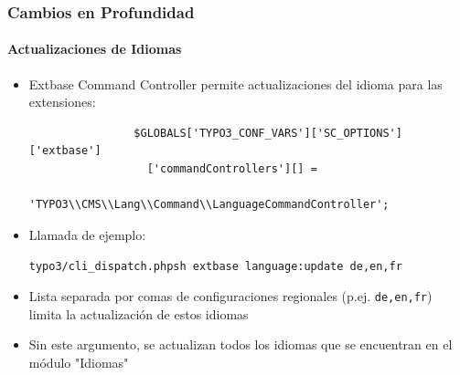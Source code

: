 
\begin{frame}[fragile]
	\frametitle{Cambios en Profundidad}
	\framesubtitle{Actualizaciones de Idiomas}

	\begin{itemize}
		\item Extbase Command Controller permite actualizaciones del idioma para las extensiones:

			\begin{lstlisting}
				$GLOBALS['TYPO3_CONF_VARS']['SC_OPTIONS']['extbase']
				  ['commandControllers'][] =
				  'TYPO3\\CMS\\Lang\\Command\\LanguageCommandController';
			\end{lstlisting}

		\item Llamada de ejemplo:

			\lstinline!typo3/cli_dispatch.phpsh extbase language:update de,en,fr!

		\item Lista separada por comas de configuraciones regionales (p.ej. \texttt{de,en,fr}) limita la actualización de estos idiomas
		\item Sin este argumento, se actualizan todos los idiomas que se encuentran en el módulo "Idiomas"

	\end{itemize}

\end{frame}


